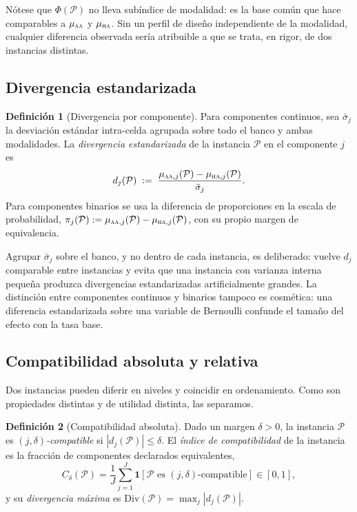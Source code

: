 \documentclass[11pt,a4paper]{article}
\theoremstyle{definition}
\newtheorem{definicion}{Definición}[section]
\theoremstyle{plain}
\theoremstyle{remark}
\newcommand{\ind}[1]{\mathbf{1}\!\left[#1\right]}
\newcommand{\modAA}{\textsc{aa}}
\newcommand{\modHA}{\textsc{ha}}
\begin{document}
Nótese que $\Phi(\mathcal{P})$ no lleva subíndice de modalidad: es la base común
que hace comparables a $\mu_{\modAA}$ y $\mu_{\modHA}$. Sin un perfil de diseño
independiente de la modalidad, cualquier diferencia observada sería atribuible a
que se trata, en rigor, de dos instancias distintas.

\subsection{Divergencia estandarizada}

\begin{definicion}[Divergencia por componente]\label{def:divergencia}
Para componentes continuos, sea $\bar\sigma_j$ la desviación estándar
intra-celda agrupada sobre todo el banco y ambas modalidades. La \emph{divergencia
estandarizada} de la instancia $\mathcal{P}$ en el componente $j$ es
\[
  d_j(\mathcal{P})\;:=\;\frac{\mu_{\modAA,j}(\mathcal{P})-\mu_{\modHA,j}(\mathcal{P})}{\bar\sigma_j}.
\]
Para componentes binarios se usa la diferencia de proporciones en la escala de
probabilidad, $\pi_j(\mathcal{P}):=\mu_{\modAA,j}(\mathcal{P})-\mu_{\modHA,j}(\mathcal{P})$,
con su propio margen de equivalencia.
\end{definicion}

Agrupar $\bar\sigma_j$ sobre el banco, y no dentro de cada instancia, es
deliberado: vuelve $d_j$ comparable entre instancias y evita que una instancia con
varianza interna pequeña produzca divergencias estandarizadas artificialmente
grandes. La distinción entre componentes continuos y binarios tampoco es
cosmética: una diferencia estandarizada sobre una variable de Bernoulli confunde
el tamaño del efecto con la tasa base.

\subsection{Compatibilidad absoluta y relativa}

Dos instancias pueden diferir en niveles y coincidir en ordenamiento. Como son
propiedades distintas y de utilidad distinta, las separamos.

\begin{definicion}[Compatibilidad absoluta]\label{def:absoluta}
Dado un margen $\delta>0$, la instancia $\mathcal{P}$ es
\emph{$(j,\delta)$-compatible} si $|d_j(\mathcal{P})|\le\delta$. El
\emph{índice de compatibilidad} de la instancia es la fracción de componentes
declarados equivalentes,
\[
  C_\delta(\mathcal{P})=\frac1J\sum_{j=1}^{J}\ind{\mathcal{P}\text{ es }(j,\delta)\text{-compatible}}\in[0,1],
\]
y su \emph{divergencia máxima} es
$\mathrm{Div}(\mathcal{P})=\max_j|d_j(\mathcal{P})|$.
\end{definicion}
\end{document}
